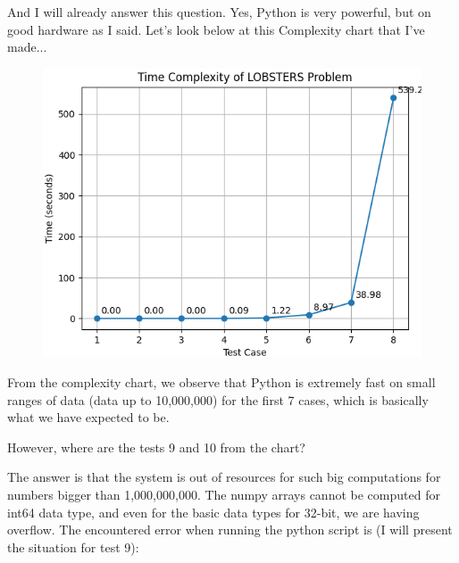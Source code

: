 \documentclass{article}%
\begin{document}
            And I will already answer this question. Yes, Python is very powerful, but on good hardware as I said.
            Let's look below at this Complexity chart that I've made...
        \vspace*{\fill}


\begin{figure}[h!]%
\centering%
\includegraphics[width=\textwidth]{time_complexity_py.png}%
\end{figure}

%
\newpage%

       \vspace*{\fill}
                              
            From the complexity chart, we observe that Python is extremely fast on small ranges of data (data up to 10,000,000) for the first 7 cases, which is basically what we have expected to be.
         \vspace{2cm}
                           
            However, where are the tests 9 and 10 from the chart?
                        
\vspace{0.2cm}
            The answer is that the system is out of resources for such big computations for numbers bigger than 1,000,000,000.
            The numpy arrays cannot be computed for int64 data type, and even for the basic data types for 32-bit, we are having overflow.
\vspace{0.2cm}
            The encountered error when running the python script is (I will present the situation for test 9):
                        
\end{document}
